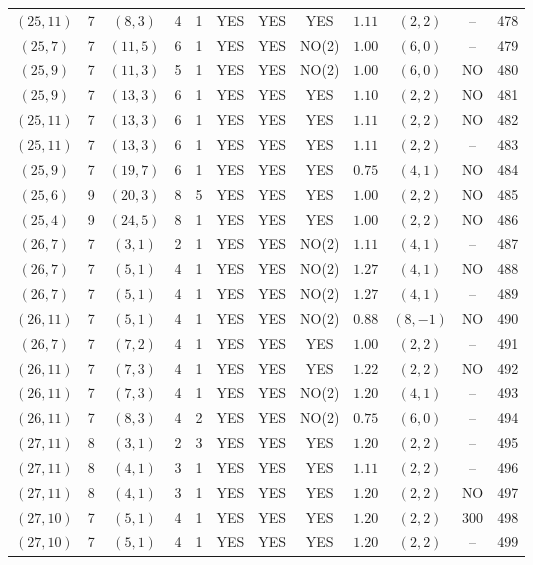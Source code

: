 \begin{longtable}{|c|c|c|c|c|c|c|c|c|c|c|c|}
$(25,11)$ & 7 & $(8,3)$ & 4 & 1 & YES & YES & YES & $1.11$ & $(2,2)$ & -- & 478\\
$(25,7)$ & 7 & $(11,5)$ & 6 & 1 & YES & YES & NO(2) & $1.00$ & $(6,0)$ & -- & 479\\
$(25,9)$ & 7 & $(11,3)$ & 5 & 1 & YES & YES & NO(2) & $1.00$ & $(6,0)$ & NO & 480\\
$(25,9)$ & 7 & $(13,3)$ & 6 & 1 & YES & YES & YES & $1.10$ & $(2,2)$ & NO & 481\\
$(25,11)$ & 7 & $(13,3)$ & 6 & 1 & YES & YES & YES & $1.11$ & $(2,2)$ & NO & 482\\
$(25,11)$ & 7 & $(13,3)$ & 6 & 1 & YES & YES & YES & $1.11$ & $(2,2)$ & -- & 483\\
$(25,9)$ & 7 & $(19,7)$ & 6 & 1 & YES & YES & YES & $0.75$ & $(4,1)$ & NO & 484\\
$(25,6)$ & 9 & $(20,3)$ & 8 & 5 & YES & YES & YES & $1.00$ & $(2,2)$ & NO & 485\\
$(25,4)$ & 9 & $(24,5)$ & 8 & 1 & YES & YES & YES & $1.00$ & $(2,2)$ & NO & 486\\
$(26,7)$ & 7 & $(3,1)$ & 2 & 1 & YES & YES & NO(2) & $1.11$ & $(4,1)$ & -- & 487\\
$(26,7)$ & 7 & $(5,1)$ & 4 & 1 & YES & YES & NO(2) & $1.27$ & $(4,1)$ & NO & 488\\
$(26,7)$ & 7 & $(5,1)$ & 4 & 1 & YES & YES & NO(2) & $1.27$ & $(4,1)$ & -- & 489\\
$(26,11)$ & 7 & $(5,1)$ & 4 & 1 & YES & YES & NO(2) & $0.88$ & $(8,-1)$ & NO & 490\\
$(26,7)$ & 7 & $(7,2)$ & 4 & 1 & YES & YES & YES & $1.00$ & $(2,2)$ & -- & 491\\
$(26,11)$ & 7 & $(7,3)$ & 4 & 1 & YES & YES & YES & $1.22$ & $(2,2)$ & NO & 492\\
$(26,11)$ & 7 & $(7,3)$ & 4 & 1 & YES & YES & NO(2) & $1.20$ & $(4,1)$ & -- & 493\\
$(26,11)$ & 7 & $(8,3)$ & 4 & 2 & YES & YES & NO(2) & $0.75$ & $(6,0)$ & -- & 494\\
$(27,11)$ & 8 & $(3,1)$ & 2 & 3 & YES & YES & YES & $1.20$ & $(2,2)$ & -- & 495\\
$(27,11)$ & 8 & $(4,1)$ & 3 & 1 & YES & YES & YES & $1.11$ & $(2,2)$ & -- & 496\\
$(27,11)$ & 8 & $(4,1)$ & 3 & 1 & YES & YES & YES & $1.20$ & $(2,2)$ & NO & 497\\
$(27,10)$ & 7 & $(5,1)$ & 4 & 1 & YES & YES & YES & $1.20$ & $(2,2)$ & 300 & 498\\
$(27,10)$ & 7 & $(5,1)$ & 4 & 1 & YES & YES & YES & $1.20$ & $(2,2)$ & -- & 499\\

\end{longtable}
